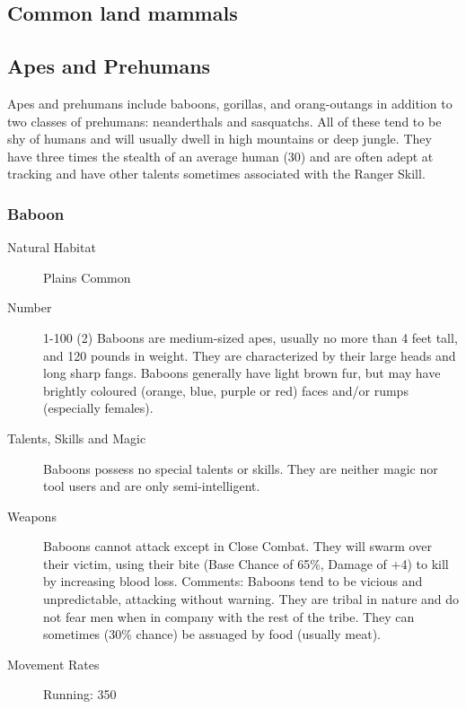 \begin{multicols}{2}

\setlength\columnseprule{0.2mm}

\section{Common land mammals}

\subsection{Apes and Prehumans}
Apes and prehumans include baboons, gorillas, and orang-outangs in
addition to two classes of prehumans: neanderthals and sasquatchs. All
of these tend to be shy of humans and will usually dwell in high
mountains or deep jungle.  They have three times the stealth of an
average human (30) and are often adept at tracking and have other
talents sometimes associated with the Ranger Skill.

\subsubsection{Baboon}

\begin{description}
\item[Natural Habitat] Plains Common

\item[Number] 1-100 (2) Baboons are medium-sized apes, usually no more than 4
feet tall, and 120 pounds in weight. They are characterized by their
large heads and long sharp fangs.  Baboons generally have light brown
fur, but may have brightly coloured (orange, blue, purple or red)
faces and/or rumps (especially females).

\item[Talents, Skills and Magic] Baboons possess no special talents or skills. They are
neither magic nor tool users and are only semi-intelligent.

\item[Weapons] Baboons cannot attack except in Close Combat.  They will
swarm over their victim, using their bite (Base Chance of 65\%,
Damage of +4) to kill by increasing blood loss.  Comments: Baboons
tend to be vicious and unpredictable, attacking without warning. They
are tribal in nature and do not fear men when in company with the rest
of the tribe.  They can sometimes (30\% chance) be assuaged by
food (usually meat).


\item[Movement Rates] Running: 350


\end{description}
\end{multicols}

